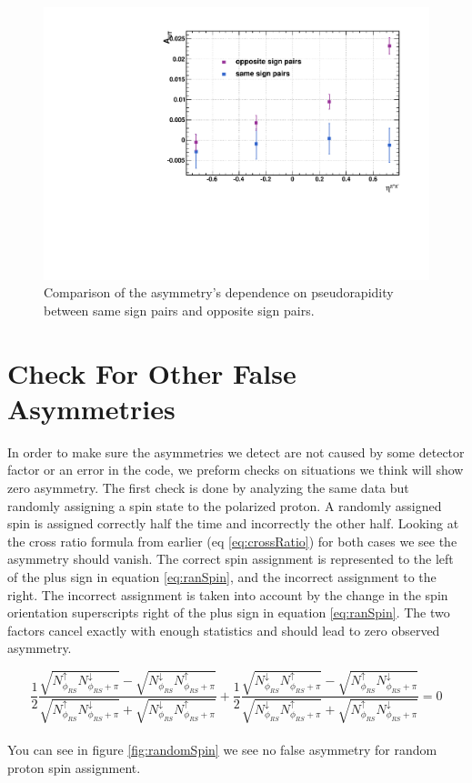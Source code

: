 \documentclass[abstract = on,listof=totoc, bibliography=totoc]{scrreprt}
\begin{document}
\begin{figure}
\begin{center}
\includegraphics[width = .7\textwidth]{asymVsEta_SameOpp}
\caption[comparison of $\eta$ asymmetry between same sign and opposite sign pairs]{Comparison of the asymmetry's dependence on pseudorapidity between same sign pairs and opposite sign pairs.}
\label{fig:samesignEta}
\end{center}
\end{figure}







\section{Check For Other False Asymmetries}
In order to make sure the asymmetries we detect are not caused by some detector factor or an error in the code, we preform checks on situations we think will show zero asymmetry. The first check is done by analyzing the same data but randomly assigning a spin state to the polarized proton. A randomly assigned spin is assigned correctly half the time and incorrectly the other half. Looking at the cross ratio formula from earlier (eq \ref{eq:crossRatio}) for both cases we see the asymmetry should vanish. The correct spin assignment is represented to the left of the plus sign in equation \ref{eq:ranSpin}, and the incorrect assignment to the right. The incorrect assignment is taken into account by the change in the spin orientation superscripts right of the plus sign in equation \ref{eq:ranSpin}. The two factors cancel exactly with enough statistics and should lead to zero observed asymmetry. 

    

 
\begin{equation}
\label{eq:ranSpin}
\frac{1}{2}\frac{\sqrt{N^\uparrow_{\phi_{RS}}N^\downarrow_{\phi_{RS}+\pi}} - \sqrt{N^\downarrow_{\phi_{RS}}N^\uparrow_{\phi_{RS}+\pi}}}{\sqrt{N^\uparrow_{\phi_{RS}}N^\downarrow_{\phi_{RS}+\pi}} + \sqrt{N^\downarrow_{\phi_{RS}}N^\uparrow_{\phi_{RS}+\pi}}}
+
\frac{1}{2}\frac{\sqrt{N^\downarrow_{\phi_{RS}}N^\uparrow_{\phi_{RS}+\pi}} - \sqrt{N^\uparrow_{\phi_{RS}}N^\downarrow_{\phi_{RS}+\pi}}}{\sqrt{N^\downarrow_{\phi_{RS}}N^\uparrow_{\phi_{RS}+\pi}} + \sqrt{N^\uparrow_{\phi_{RS}}N^\downarrow_{\phi_{RS}+\pi}}} = 0
\end{equation}\\
%
You can see in figure \ref{fig:randomSpin} we see no false asymmetry for random proton spin assignment. 
\end{document}
